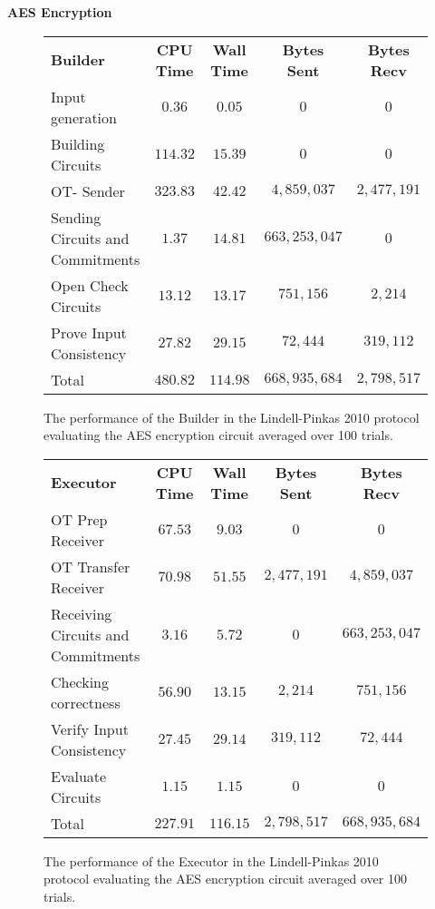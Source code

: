\documentclass[ %
                    author={Nicholas Tutte},
                supervisor={Prof. Nigel Smart},
                    degree={MEng},
                     title={Secure Two Party Computation},
                  subtitle={A practical comparison of recent protocols},
                      type={Research - GG1K},
                      year={2015} ]{dissertation}
\begin{document}
				\FloatBarrier
				\noindent \textbf{AES Encryption}
				\begin{figure}[!ht]
					\begin{tabular}{| p{4.3cm} | c c c c |}
						\hline
						\textbf{Builder} & \textbf{CPU Time} & \textbf{Wall Time} & \textbf{Bytes Sent} & \textbf{Bytes Recv} \\
						\thickhline
						Input generation & $0.36$ & $0.05$ & $0$ & $0$ \\
						\hline
						Building Circuits & $114.32$ & $15.39$ & $0$ & $0$ \\
						\hline
						OT- Sender & $323.83$ & $42.42$ & $4,859,037$ & $2,477,191$ \\
						\hline
						Sending Circuits and Commitments & $1.37$ & $14.81$ & $663,253,047$ & $0$ \\
						\hline
						Open Check Circuits & $13.12$ & $13.17$ & $751,156$ & $2,214$ \\
						\hline
						Prove Input Consistency & $27.82$ & $29.15$ & $72,444$ & $319,112$ \\
						\thickhline
						Total & $480.82$ & $114.98$ & $668,935,684$ & $2,798,517$ \\
						\hline
					\end{tabular}
					\caption{The performance of the Builder in the Lindell-Pinkas 2010 protocol evaluating the AES encryption circuit averaged over 100 trials. \label{table:LP_2010_AES_Builder}}
				\end{figure}

				\begin{figure}[!ht]
					\begin{tabular}{| p{4.3cm} | c c c c |}
						\hline
						\textbf{Executor} & \textbf{CPU Time} & \textbf{Wall Time} & \textbf{Bytes Sent} & \textbf{Bytes Recv} \\
						\thickhline
						OT Prep Receiver & $67.53$ & $9.03$ & $0$ & $0$ \\
						\hline
						OT Transfer Receiver & $70.98$ & $51.55$ & $2,477,191$ & $4,859,037$ \\
						\hline
						Receiving Circuits and Commitments & $3.16$ & $5.72$ & $0$ & $663,253,047$ \\
						\hline
						Checking correctness & $56.90$ & $13.15$ & $2,214$ & $751,156$ \\
						\hline
						Verify Input Consistency & $27.45$ & $29.14$ & $319,112$ & $72,444$ \\
						\hline
						Evaluate Circuits & $1.15$ & $1.15$ & $0$ & $0$ \\
						\thickhline
						Total & $227.91$ & $116.15$ & $2,798,517$ & $668,935,684$ \\
						\hline
					\end{tabular}
					\caption{The performance of the Executor in the Lindell-Pinkas 2010 protocol evaluating the AES encryption circuit averaged over 100 trials. \label{table:LP_2010_AES_Executor}}
				\end{figure}
				\FloatBarrier
\end{document}
